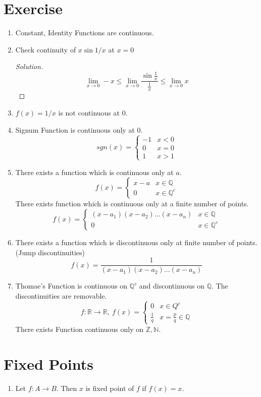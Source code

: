 \section{Exercise}
\begin{enumerate}
	\item Constant, Identity Functions are continuous.
	\item Check continuity of $x\sin 1/x$ at $x =0$
	\begin{proof}[Solution]
		$$ \lim_{x \to 0} -x \le \lim_{x \to 0} \frac{\sin \frac{1}{x}}{\frac{1}{x}} \le \lim_{x \to 0} x $$
	\end{proof}
	\item $f(x) = 1/x$ is not continuous at $0$.
	\item Signum Function is continuous only at $0$.
		$$ sgn(x) = \begin{cases} -1 & x < 0 \\ 0 & x = 0 \\ 1 & x>1 \end{cases} $$
	\item There exists a function which is continuous only at $a$.
		$$f(x) = \begin{cases} x-a & x \in \mathbb{Q} \\ 0 & x \in \mathbb{Q}^c \end{cases} $$
	\subitem There exists function which is continuous only at a finite number of points.
		$$f(x) = \begin{cases} (x-a_1)(x-a_2)\dots(x-a_n) & x \in \mathbb{Q} \\ 0 & x \in \mathbb{Q}^c \end{cases} $$
	\item There exists a function which is discontinuous only at finite number of points. (Jump discontinuities) 
		$$ f(x) = \frac{1}{(x-a_1)(x-a_2)\dots(x-a_n)} $$
	\item Thomae's Function is continuous on $\mathbb{Q}^c$ and discontinuous on $\mathbb{Q}$. The discontinuities are removable.
		$$ f : \mathbb{R} \to \mathbb{R},\ f(x) = \begin{cases} 0 & x \in Q^c \\ \frac{1}{q} & x = \frac{p}{q} \in \mathbb{Q} \end{cases} $$
	\subitem There exists Function continuous only on $\mathbb{Z},\mathbb{N}$. 
\end{enumerate}

\section{Fixed Points}
\begin{enumerate}
	\item Let $f : A \to B$. Then $x$ is fixed point of $f$ if $f(x) = x$.
\end{enumerate}

